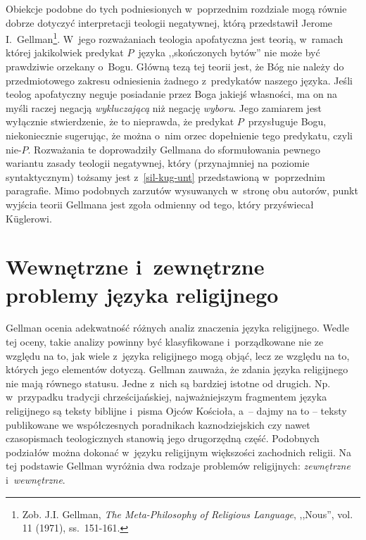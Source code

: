 Obiekcje podobne do tych podniesionych w~poprzednim rozdziale mogą równie dobrze dotyczyć interpretacji teologii negatywnej, którą przedstawił Jerome I.~Gellman\footnote{Zob. J.I. Gellman, \textit{The Meta-Philosophy of Religious Language}, ,,Nous'', vol. 11 (1971), ss.~151-161.}. W~jego rozważaniach teologia apofatyczna jest teorią, w~ramach której jakikolwiek predykat $P$~języka ,,skończonych bytów'' nie może być prawdziwie orzekany o~Bogu. Główną tezą tej teorii jest, że Bóg nie należy do przedmiotowego zakresu odniesienia żadnego z~predykatów naszego języka. Jeśli teolog apofatyczny neguje posiadanie przez Boga jakiejś własności, ma on na myśli raczej negacją \textit{wykluczającą} niż negację \textit{wyboru}. Jego zamiarem jest wyłącznie stwierdzenie, że to nieprawda, że predykat $P$~przysługuje Bogu, niekoniecznie sugerując, że można o~nim orzec dopełnienie tego predykatu, czyli nie-$P$. Rozważania te doprowadziły Gellmana do sformułowania pewnego wariantu zasady teologii negatywnej, który (przynajmniej na poziomie syntaktycznym) tożsamy jest z~\ref{sil-kug-unt} przedstawioną w~poprzednim paragrafie. Mimo podobnych zarzutów wysuwanych w~stronę obu autorów, punkt wyjścia teorii Gellmana jest zgoła odmienny od tego, który przyświecał Küglerowi.


\section{Wewnętrzne i~zewnętrzne problemy języka religijnego}

Gellman ocenia adekwatność różnych analiz znaczenia języka religijnego. Wedle tej oceny, takie analizy powinny być klasyfikowane i~porządkowane nie ze względu na to, jak wiele z~języka religijnego mogą objąć, lecz ze względu na to, których jego elementów dotyczą. Gellman zauważa, że zdania języka religijnego nie mają równego statusu. Jedne z~nich są bardziej istotne od drugich. Np. w~przypadku tradycji chrześcijańskiej, najważniejszym fragmentem języka religijnego są teksty biblijne i~pisma Ojców Kościoła, a~-- dajmy na to -- teksty publikowane we współczesnych poradnikach kaznodziejskich czy nawet czasopismach teologicznych stanowią jego drugorzędną część. Podobnych podziałów można dokonać w~języku religijnym większości zachodnich religii. Na tej podstawie Gellman wyróżnia dwa rodzaje problemów religijnych: \textit{zewnętrzne} i~\textit{wewnętrzne}.

